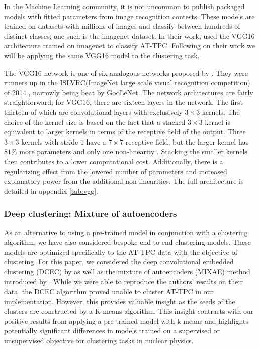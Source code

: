 \documentclass[preprint,12pt]{elsarticle}
\begin{document}
In the Machine Learning community, it is not uncommon to publish packaged models with fitted parameters from image recognition contests. These models are trained on datasets with millions of images and classify between hundreds of distinct classes; one such is the imagenet dataset. In their work, \citet{Kuchera2019} used the VGG16 architecture trained on imagenet to classify AT-TPC. Following on their work we will be applying the same VGG16 model to the clustering task. 

The VGG16 network is one of six analogous networks proposed by \citet{Simonyan2014}. They were runners up in the ISLVRC(ImageNet large scale visual recognition competition) of 2014 \cite{Russakovsky2015}, narrowly being beat by GooLeNet. The network architectures are fairly straightforward; for VGG16, there are sixteen layers in the network. The first thirteen of which are convolutional layers with exclusively $3 \times 3$ kernels. The choice of the kernel size is based on the fact that a stacked $3 \times 3$ kernel is equivalent to larger kernels in terms of the receptive field of the output. Three $3 \times 3$ kernels with stride $1$ have a $7 \times 7$ receptive field, but the larger kernel has $81\%$ more parameters and only one non-linearity \cite{Simonyan2014}. Stacking the smaller kernels then contributes to a lower computational cost. Additionally, there is a regularizing effect from the lowered number of parameters and increased explanatory power from the additional non-linearities. The full architecture is detailed in appendix \ref{tab:vgg}.

\subsubsection{Deep clustering: Mixture of autoencoders}\label{sec:mixae}

As an alternative to using a pre-trained model in conjunction with a clustering algorithm, we have also considered bespoke end-to-end clustering models. These models are optimized specifically to the AT-TPC data with the objective of clustering. For this paper, we considered the deep convolutional embedded clustering (DCEC) by \citet{Guo2017} as well as the mixture of autoencoders (MIXAE) method introduced by \citet{Zhang}. While we were able to reproduce the authors' results on their data, the DCEC algorithm proved unable to cluster AT-TPC in our implementation. However, this provides valuable insight as the seeds of the clusters are constructed by a K-means algorithm. This insight contrasts with our positive results from applying a pre-trained model with k-means and highlights potentially significant differences in models trained on a supervised or unsupervised objective for clustering tasks in nuclear physics. 
\end{document}
